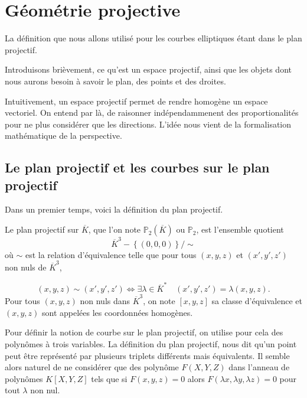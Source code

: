 \chapter{Géométrie projective}

La définition que nous allons utilisé pour les courbes elliptiques étant dans le plan
projectif.

Introduisons brièvement, ce qu'est un espace projectif, ainsi que les objets dont nous aurons
besoin à savoir le plan, des points et des droites.

Intuitivement, un espace projectif permet de rendre homogène un espace vectoriel. On entend
par là, de raisonner indépendammenent des proportionalités pour ne plus considérer que les
directions. L'idée nous vient de la formalisation mathématique de la perspective. 

\section{Le plan projectif et les courbes sur le plan projectif}

Dans un premier temps, voici la définition du plan projectif.

\begin{definition}
    \label{def:planP2}
    
    Le plan projectif sur $\overline{K}$, que l'on note $\mathbb{P}_{2}(\overline{K})$ ou
    $\mathbb{P}_{2}$, est l'ensemble quotient
    \[
    \overline{K}^3 - \left\{ (0,0,0) \right\} / \sim
    \] 
    où $\sim$ est la relation d'équivalence telle que pour tous $\left( x,y,z \right) $ et
    $\left( x',y',z'\right) $ non nuls de $\overline{K}^3$,

    \[
    \left( x,y,z \right) \sim \left( x',y',z' \right) \iff \exists \lambda \in
    \overline{K}^{*} \quad \left( x',y',z' \right) = \lambda \left( x,y,z \right) 
    .\] 
    Pour tous $\left( x,y,z \right) $ non nuls dans $\overline{K}^3$, on note $\left[
    x,y,z \right] $ sa classe d'équivalence et $(x,y,z)$ sont appelées les coordonnées homogènes.
\end{definition}

Pour définir la notion de courbe sur le plan projectif, on utilise pour cela des polynômes à
trois variables. La définition du plan projectif, nous dit qu'un point peut être représenté par
plusieurs triplets différents mais équivalents. Il semble alors naturel de ne considérer
que des polynôme $F(X,Y,Z)$ dans l'anneau de polynômes $K[X,Y,Z]$ tels que si $F(x,y,z) = 0$ alors $F(\lambda x, \lambda
y, \lambda z) = 0$ pour tout $\lambda$ non nul.

